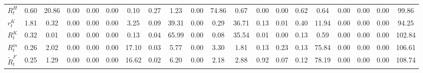 \begin{center}
\begin{longtable}{lccccccccccccccccccc}
$   R^H_t                   $	 & 	                0.60	 & 	               20.86	 & 	                0.00	 & 	                0.00	 & 	                0.00	 & 	                0.10	 & 	                0.27	 & 	                1.23	 & 	                0.00	 & 	               74.86	 & 	                0.67	 & 	                0.00	 & 	                0.00	 & 	                0.62	 & 	                0.64	 & 	                0.00	 & 	                0.00	 & 	                0.00	 & 	               99.86 \\ 
$ r^K_t                     $	 & 	                1.81	 & 	                0.32	 & 	                0.00	 & 	                0.00	 & 	                0.00	 & 	                3.25	 & 	                0.09	 & 	               39.31	 & 	                0.00	 & 	                0.29	 & 	               36.71	 & 	                0.13	 & 	                0.01	 & 	                0.40	 & 	               11.94	 & 	                0.00	 & 	                0.00	 & 	                0.00	 & 	               94.25 \\ 
$  R^K_t                    $	 & 	                0.32	 & 	                0.01	 & 	                0.00	 & 	                0.00	 & 	                0.00	 & 	                0.13	 & 	                0.04	 & 	               65.99	 & 	                0.00	 & 	                0.08	 & 	               35.54	 & 	                0.01	 & 	                0.00	 & 	                0.13	 & 	                0.59	 & 	                0.00	 & 	                0.00	 & 	                0.00	 & 	              102.84 \\ 
$  R^m_t                    $	 & 	                0.26	 & 	                2.02	 & 	                0.00	 & 	                0.00	 & 	                0.00	 & 	               17.10	 & 	                0.03	 & 	                5.77	 & 	                0.00	 & 	                3.30	 & 	                1.81	 & 	                0.13	 & 	                0.23	 & 	                0.13	 & 	               75.84	 & 	                0.00	 & 	                0.00	 & 	                0.00	 & 	              106.61 \\ 
$  \tilde{R}^F_t            $	 & 	                0.25	 & 	                1.29	 & 	                0.00	 & 	                0.00	 & 	                0.00	 & 	               16.62	 & 	                0.02	 & 	                6.20	 & 	                0.00	 & 	                2.18	 & 	                2.88	 & 	                0.92	 & 	                0.07	 & 	                0.12	 & 	               78.19	 & 	                0.00	 & 	                0.00	 & 	                0.00	 & 	              108.74 \\ 

\end{longtable}
\end{center}
